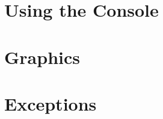 \chapter{Using the Console} \label{cConsole}

\chapter{Graphics} \label{cGraphics}

\chapter{Exceptions}
